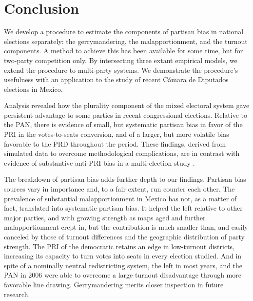 \documentclass[letter,12pt]{article}
\begin{document}
\section{Conclusion}

We develop a procedure to estimate the components of partisan bias in national elections separately: the gerrymandering, the malapportionment, and the turnout components. A method to achieve this has been available for some time, but for two-party competition only. By intersecting three extant empirical models, we extend the procedure to multi-party systems. We demonstrate the procedure's usefulness with an application to the study of recent C\'amara de Diputados elections in Mexico. 

Analysis revealed how the plurality component of the mixed electoral system gave persistent advantage to some parties in recent congressional elections. Relative to the PAN, there is evidence of small, but systematic partisan bias in favor of the PRI in the votes-to-seats conversion, and of a larger, but more volatile bias favorable to the PRD throughout the period. These findings, derived from simulated data to overcome methodological complications, are in contrast with evidence of substantive anti-PRI bias in a multi-election study \citep{marquez2014biasBlog}. 

The breakdown of partisan bias adds further depth to our findings. Partisan bias sources vary in importance and, to a fair extent, run counter each other. The prevalence of substantial malapportionment in Mexico has not, as a matter of fact, translated into systematic partisan bias. It helped the left relative to other major parties, and with growing strength as maps aged and further malapportionment crept in, but the contribution is much smaller than, and easily canceled by those of turnout differences and the geographic distribution of party strength. The PRI of the democratic retains an edge in low-turnout districts, increasing its capacity to turn votes into seats in every election studied. And in spite of a nominally neutral redistricting system, the left in most years, and the PAN in 2006 were able to overcome a large turnout disadvantage through more favorable line drawing. Gerrymandering merits closer inspection in future research. 


\end{document}

